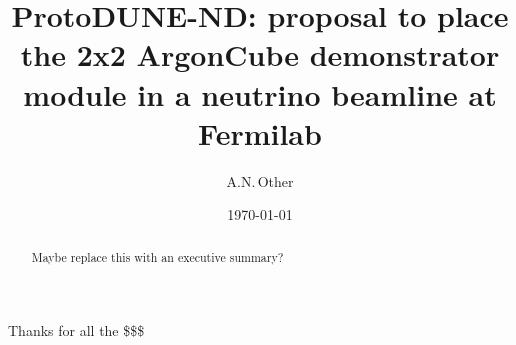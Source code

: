 \documentclass[aps,prd,preprint,superscriptaddress,nofootinbib]{revtex4-1}
\begin{document}
\title{ProtoDUNE-ND: proposal to place the 2x2 ArgonCube demonstrator module in a neutrino beamline at Fermilab}

\author{A.N.\,Other}

\date{\today}

\begin{abstract}
Maybe replace this with an executive summary?
\end{abstract}

\maketitle








\begin{acknowledgments}
Thanks for all the \$\$\$
\end{acknowledgments}


%
\end{document}
